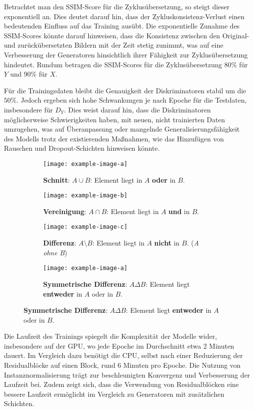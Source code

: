 Betrachtet man den SSIM-Score für die Zyklusübersetzung, so steigt dieser exponentiell an. Dies deutet darauf hin, dass der Zykluskonsistenz-Verlust einen bedeutenden Einfluss auf das Training ausübt. Die exponentielle Zunahme des SSIM-Scores könnte darauf hinweisen, dass die Konsistenz zwischen den Original- und zurückübersetzten Bildern mit der Zeit stetig zunimmt, was auf eine Verbesserung der Generatoren hinsichtlich ihrer Fähigkeit zur Zyklusübersetzung hindeutet. Rundum betragen die SSIM-Scores für die Zyklusübersetzung $80\%$ für $Y$ und $90\%$ für $X$.

Für die Trainingsdaten bleibt die Genauigkeit der Diskriminatoren stabil um die $50\%$. Jedoch ergeben sich hohe Schwankungen je nach Epoche für die Testdaten, insbesondere für $D_Y$. Dies weist darauf hin, dass die Diskriminatoren möglicherweise Schwierigkeiten haben, mit neuen, nicht trainierten Daten umzugehen, was auf Überanpassung oder mangelnde Generalisierungsfähigkeit des Modells trotz der existierenden Maßnahmen, wie das Hinzufügen von Rauschen und Dropout-Schichten hinweisen könnte. 

\begin{figure}
    \begin{subfigure}[t]{.4\textwidth}
      \centering
      \texttt{[image: example-image-a]}
      \caption{\textbf{Schnitt}: $A \cup B$: Element liegt in $A$ \textbf{oder} in $B$.}
    \end{subfigure}
    \hfill
    \begin{subfigure}[t]{.4\textwidth}
      \centering
      \texttt{[image: example-image-b]}
      \caption{\textbf{Vereinigung}: $A \cap B$: Element liegt in $A$ \textbf{und} in $B$.}
    \end{subfigure}
  
    \medskip
  
    \begin{subfigure}[t]{.4\textwidth}
      \centering
      \texttt{[image: example-image-c]}
      \caption{\textbf{Differenz}: $A \setminus B$: Element liegt in $A$ \textbf{nicht} in $B$. (\textit{A ohne B})}
    \end{subfigure}
    \hfill
    \begin{subfigure}[t]{.4\textwidth}
      \centering
      \texttt{[image: example-image-a]}
      \caption{\textbf{Symmetrische Differenz}: $A \Delta B$: Element liegt \textbf{entweder} in $A$ oder in $B$.}
    \end{subfigure}
  \end{figure}

  Die Laufzeit des Trainings spiegelt die Komplexität der Modelle wider, insbesondere auf der GPU, wo jede Epoche im Durchschnitt etwa 2 Minuten dauert. Im Vergleich dazu benötigt die CPU, selbst nach einer Reduzierung der Residualblöcke auf einen Block, rund 6 Minuten pro Epoche. Die Nutzung von Instanznormalisierung trägt zur beschleunigten Konvergenz und Verbesserung der Laufzeit bei. Zudem zeigt sich, dass die Verwendung von Residualblöcken eine bessere Laufzeit ermöglicht im Vergleich zu Generatoren mit zusätzlichen Schichten. 